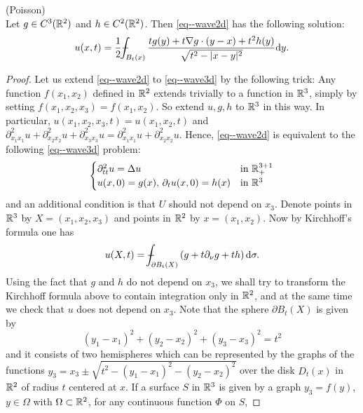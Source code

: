 \documentclass[11pt]{article}
\begin{document}
				\begin{thm}
					(Poisson)\\
					Let $g\in C^3(\mathbb{R}^2)$ and $h\in C^2(\mathbb{R}^2)$. Then \eqref{eq--wave2d} has the following solution:
					\begin{equation*}
						u(x,t)=\frac{1}{2}\dashint_{B_t(x)}\frac{tg(y)+t\nabla g\cdot(y-x)+t^2h(y)}{\sqrt{t^2-|x-y|^2}}\mathrm{d}y.
					\end{equation*}
				\end{thm}
				\begin{proof}
					Let us extend \eqref{eq--wave2d} to \eqref{eq--wave3d} by the following trick: Any function $f(x_1,x_2)$ defined in $\mathbb{R}^2$ extends trivially to a function in $\mathbb{R}^3$, simply by setting $f(x_1,x_2,x_3)=f(x_1,x_2)$. So extend $u,g,h$ to $\mathbb{R}^3$ in this way. In particular, $u(x_1,x_2,x_3,t)=u(x_1,x_2,t)$ and $\partial_{x_1x_1}^2u+\partial_{x_2x_2}^2u+\partial_{x_3x_3}^2u=\partial_{x_1x_1}^2u+\partial_{x_2x_2}^2u$. Hence, \eqref{eq--wave2d} is equivalent to the following \eqref{eq--wave3d} problem:
					\begin{equation*}
						\begin{cases}
							\partial_{tt}^2u=\Delta u & \text{in }\mathbb{R}^{3+1}_+\\
							u(x,0)=g(x),\,\partial_tu(x,0)=h(x) & \text{in }\mathbb{R}^3
						\end{cases}
					\end{equation*}
					and an additional condition is that $U$ should not depend on $x_3$. Denote points in $\mathbb{R}^3$ by $X=(x_1,x_2,x_3)$ and points in $\mathbb{R}^2$ by $x=(x_1,x_2)$. Now by Kirchhoff's formula one has
					\begin{equation*}
						u(X,t)=\dashint_{\partial B_t(X)}\left(g+t\partial_\nu g+th\right)\mathrm{d}\sigma.
					\end{equation*} 
					Using the fact that $g$ and $h$ do not depend on $x_3$, we shall try to transform the Kirchhoff formula above to contain integration only in $\mathbb{R}^2$, and at the same time we check that $u$ does not depend on $x_3$. Note that the sphere $\partial B_t(X)$ is given by
					\begin{equation*}
						(y_1-x_1)^2+(y_2-x_2)^2+(y_3-x_3)^2=t^2
					\end{equation*}
					and it consists of two hemispheres which can be represented by the graphs of the functions $y_3=x_3\pm\sqrt{t^2-(y_1-x_1)^2-(y_2-x_2)^2}$ over the disk $D_t(x)$ in $\mathbb{R}^2$ of radius $t$ centered at $x$. If a surface $S$ in $\mathbb{R}^3$ is given by a graph $y_3=f(y)$, $y\in\Omega$ with $\Omega\subset\mathbb{R}^2$, for any continuous function $\Phi$ on $S$,

\end{proof}
\end{document}

